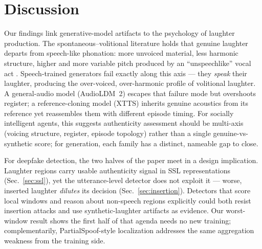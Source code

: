 \documentclass[sigconf,anonymous,review]{acmart}
\begin{document}
\section{Discussion}
Our findings link generative-model artifacts to the psychology of laughter production. The spontaneous--volitional literature holds that genuine laughter departs from speech-like phonation: more unvoiced material, less harmonic structure, higher and more variable pitch produced by an ``unspeechlike'' vocal act \cite{bachorowski2001acoustic,bryant2014animal,lavan2016laugh}. Speech-trained generators fail exactly along this axis --- they \emph{speak} their laughter, producing the over-voiced, over-harmonic profile of volitional laughter. A general-audio model (AudioLDM~2) escapes that failure mode but overshoots register; a reference-cloning model (XTTS) inherits genuine acoustics from its reference yet reassembles them with different episode timing. For socially intelligent agents, this suggests authenticity assessment should be multi-axis (voicing structure, register, episode topology) rather than a single genuine-vs-synthetic score; for generation, each family has a distinct, nameable gap to close.

For deepfake detection, the two halves of the paper meet in a design implication. Laughter regions carry usable authenticity signal in SSL representations (Sec.~\ref{sec:ssl}), yet the utterance-level detector does not exploit it --- worse, inserted laughter \emph{dilutes} its decision (Sec.~\ref{sec:insertion}). Detectors that score local windows and reason about non-speech regions explicitly could both resist insertion attacks and use synthetic-laughter artifacts as evidence. Our worst-window result shows the first half of that agenda needs no new training; complementarily, PartialSpoof-style localization \cite{zhang2023partialspoof} addresses the same aggregation weakness from the training side.
\end{document}
